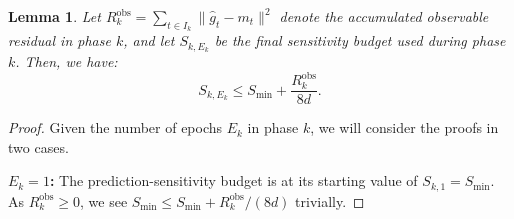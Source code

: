 \documentclass[journal,onecolumn]{IEEEtran}
\theoremstyle{plain}
\newtheorem{lemma}[theorem]{Lemma}
\theoremstyle{definition}
\theoremstyle{remark}
\begin{document}
{

\begin{lemma}
    \label{lem:finalS-phase} Let $R^{\mathrm{obs}}_{k}= \sum_{t\in I_k}\|\hat g
    _{t}-m_{t}\|^{2}$ denote the accumulated observable residual in phase $k$,
    and let $S_{k,E_k}$ be the final sensitivity budget used during phase $k$. Then, we have:
    \begin{equation*}
        S_{k,E_k}\le S_{\min} + \frac{R^{\mathrm{obs}}_{k}}{8d}.
    \end{equation*}
\end{lemma}

\begin{proof}
    Given the number of epochs $E_k$ in phase $k$, we will consider the proofs in two cases.

    \textbf{$E_{k}=1$:} The prediction-sensitivity budget is at its starting value of $S_{k,1}=S_{\min}$.
    As $R^{\mathrm{obs}}_{k} \ge 0$, we see $S_{\min} \le S_{\min} + R^{\mathrm{obs}}_{k}/(8d)$ trivially.


\end{proof}}
\end{document}
